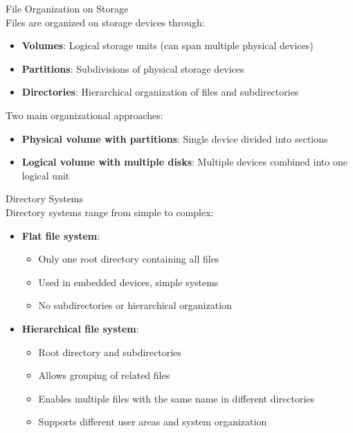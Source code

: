 \begin{definition}{File Organization on Storage}\\
    Files are organized on storage devices through:
    \begin{itemize}
        \item \textbf{Volumes}: Logical storage units (can span multiple physical devices)
        \item \textbf{Partitions}: Subdivisions of physical storage devices
        \item \textbf{Directories}: Hierarchical organization of files and subdirectories
    \end{itemize}
    
    Two main organizational approaches:
    \begin{itemize}
        \item \textbf{Physical volume with partitions}: Single device divided into sections
        \item \textbf{Logical volume with multiple disks}: Multiple devices combined into one logical unit
    \end{itemize}
\end{definition}

\begin{definition}{Directory Systems}\\
    Directory systems range from simple to complex:
    \begin{itemize}
        \item \textbf{Flat file system}:
            \begin{itemize}
                \item Only one root directory containing all files
                \item Used in embedded devices, simple systems
                \item No subdirectories or hierarchical organization
            \end{itemize}
        \item \textbf{Hierarchical file system}:
            \begin{itemize}
                \item Root directory and subdirectories
                \item Allows grouping of related files
                \item Enables multiple files with the same name in different directories
                \item Supports different user areas and system organization
            \end{itemize}
    \end{itemize}
\end{definition}

